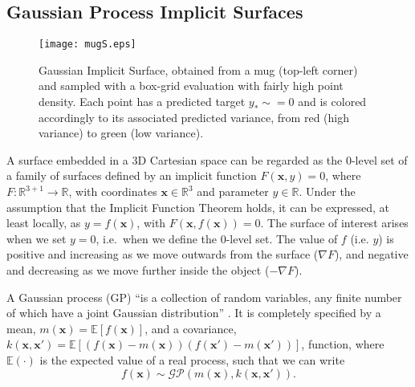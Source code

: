 
\subsection{Gaussian Process Implicit Surfaces}
\label{sec:gpis}
\begin{figure}[t]
    \centering
    \texttt{[image: mugS.eps]}
    \caption{Gaussian Implicit Surface, obtained from a mug (top-left corner) and sampled with a box-grid evaluation with fairly high point density. Each point has a predicted target $y_* \sim= 0$ and is colored accordingly to its associated
    predicted variance, from red (high variance) to green (low variance).}
    \label{fig:gpmug}
\end{figure}

A surface embedded in a 3D Cartesian space can be regarded as the $0$-level set of a family of surfaces defined by an implicit function $F(\mathbf{x}, y)=0$, where $F:\mathbb{R}^{3+1}\rightarrow \mathbb{R}$, with coordinates $\mathbf{x}\in \mathbb{R}^3$ and parameter $y\in \mathbb{R}$.
 Under the assumption that the Implicit Function Theorem holds, it can be expressed, at least locally, as $y = f(\mathbf{x})$, with $F(\mathbf{x},f(\mathbf{x}))=0$. The surface of  interest arises when we set $y = 0$, i.e.\ when we define the $0$-level set. The value of $f$ (i.e. $y$) is positive and increasing as we move outwards from the surface ($\nabla F$), and negative and decreasing as we move further inside the object ($-\nabla F$).

A Gaussian process (GP) ``is a collection of random variables, any finite number of which have a joint Gaussian distribution'' \cite[Def. 2.1]{Rasmussen2006Gaussian}. It is completely specified by a mean, $m(\mathbf{x}) = \mathbb{E}[f(\mathbf{x})]$, and a covariance, $k(\mathbf{x},\mathbf{x}') = \mathbb{E}[(f(\mathbf{x}) - m(\mathbf{x}))(f(\mathbf{x}') - m(\mathbf{x}'))]$, function, where $\mathbb{E}(\cdot)$ is the expected value of a real process, such that we can write
\begin{equation}
f(\mathbf{x}) \sim \mathcal{GP}(m(\mathbf{x}), k(\mathbf{x},\mathbf{x}')).
\end{equation}

